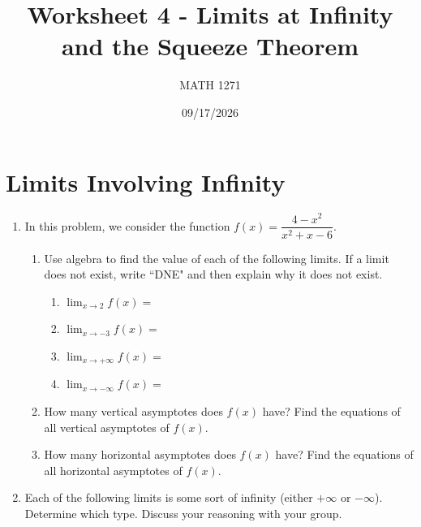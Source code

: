 \documentclass[12pt]{exam}
\title{Worksheet 4 - Limits at Infinity and the Squeeze Theorem}
\author{MATH 1271}
\date{09/17/2026}
\begin{document}
\newpage
\maketitle

\section{Limits Involving Infinity}
\begin{enumerate}

\item[1.] In this problem, we consider the function $f(x)=\dfrac{4-x^2}{x^2+x-6}$.

\begin{enumerate}

\item[(a)] Use algebra to find the value of each of the following limits. If a limit does not exist, write ``DNE" and then explain why it does not exist.

	\begin{enumerate}
	\item[(i)] $\displaystyle\lim_{x\to 2}f(x)=$
	\vfill
	\item[(ii)] $\displaystyle\lim_{x\to -3}f(x)=$
	\vfill
	\item[(iii)] $\displaystyle\lim_{x\to+\infty} f(x)=$
	\vfill
	\item[(iv)] $\displaystyle\lim_{x\to -\infty} f(x)=$
	\vfill
	\end{enumerate}
	
\item[(b)] How many vertical asymptotes does $f(x)$ have? Find the equations of all vertical asymptotes of $f(x)$. 

\vspace{1in}

\item[(c)] How many horizontal asymptotes does $f(x)$ have? Find the equations of all horizontal asymptotes of $f(x)$.

\vspace{1in}

\end{enumerate}

\newpage

\item[2.] Each of the following limits is some sort of infinity (either $+\infty$ or $-\infty$). Determine which type. Discuss your reasoning with your group.

\begin{enumerate}


\end{enumerate}
\end{enumerate}
\end{document}
